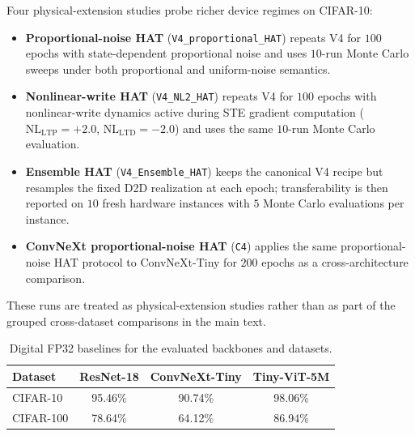 Four physical-extension studies probe richer device regimes on CIFAR-10:
\begin{itemize}[leftmargin=1.4em,itemsep=2pt,topsep=2pt]
    \item \textbf{Proportional-noise HAT} (\texttt{V4\_proportional\_HAT}) repeats V4 for \(100\) epochs with state-dependent proportional noise and uses \(10\)-run Monte Carlo sweeps under both proportional and uniform-noise semantics.
    \item \textbf{Nonlinear-write HAT} (\texttt{V4\_NL2\_HAT}) repeats V4 for \(100\) epochs with nonlinear-write dynamics active during STE gradient computation (\(\mathrm{NL}_{\mathrm{LTP}}=+2.0\), \(\mathrm{NL}_{\mathrm{LTD}}=-2.0\)) and uses the same \(10\)-run Monte Carlo evaluation.
    \item \textbf{Ensemble HAT} (\texttt{V4\_Ensemble\_HAT}) keeps the canonical V4 recipe but resamples the fixed D2D realization at each epoch; transferability is then reported on \(10\) fresh hardware instances with \(5\) Monte Carlo evaluations per instance.
    \item \textbf{ConvNeXt proportional-noise HAT} (\texttt{C4}) applies the same proportional-noise HAT protocol to ConvNeXt-Tiny for \(200\) epochs as a cross-architecture comparison.
\end{itemize}
These runs are treated as physical-extension studies rather than as part of the grouped cross-dataset comparisons in the main text.

\begin{table}[ht]
    \centering
    \caption{Digital FP32 baselines for the evaluated backbones and datasets.}
    \label{tab:supp-fp32-baselines}
    \begin{tabular}{lccc}
        \toprule
        \textbf{Dataset} & \textbf{ResNet-18} & \textbf{ConvNeXt-Tiny} & \textbf{Tiny-ViT-5M} \\
        \midrule
        CIFAR-10 & 95.46\% & 90.74\% & 98.06\% \\
        CIFAR-100 & 78.64\% & 64.12\% & 86.94\% \\
        \bottomrule
    \end{tabular}
\end{table}

